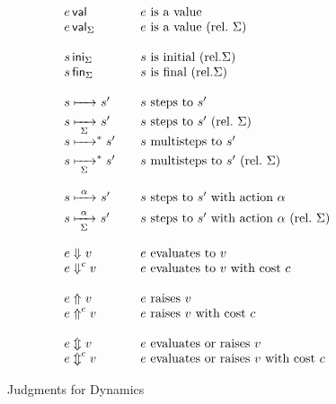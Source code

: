 \documentclass[11pt]{article}
\begin{document}
\begin{figure}[tp]
    \begin{displaymath}
        \begin{array}{l@{\qquad}l}
            \isVal{e}            &  e\ \text{is a value} \\
            \isVal[\Sigma]{e}    & e\ \text{is a value}\ (\text{rel.}\ \Sigma) \\\\
            \isIni[\Sigma]{s}            & s\ \text{is initial}\ (\text{rel.} \Sigma) \\
            \isFin[\Sigma]{s}            & s\ \text{is final}\ (\text{rel.} \Sigma) \\\\
            s\stepsTo s'         & s\ \text{steps to}\ s' \\
            s\stepsTo[\Sigma] s' & s\ \text{steps to}\ s'\ (\text{rel.}\ \Sigma)\\
            s\stepsTo(\ast) s' & s\ \text{multisteps to}\ s' \\
            s\stepsTo[\Sigma](\ast) s' & s\ \text{multisteps to}\ s'\ (\text{rel.}\ \Sigma) \\\\
            s\stepsTo<\alpha> s' & s\ \text{steps to}\ s'\ \text{with action}\ \alpha \\
            s\stepsTo[\Sigma]<\alpha> s' & s\ \text{steps to}\ s'\ \text{with action}\ \alpha\ (\text{rel.}\ \Sigma) \\\\
            e\evalsTo v          & e\ \text{evaluates to}\ v \\
            e\evalsTo(c) v       & e\ \text{evaluates to}\ v\ \text{with cost}\ c \\\\
            e\raises v           & e\ \text{raises}\ v \\
            e\raises(c) v        & e\ \text{raises}\ v\ \text{with cost}\ c \\\\
            e\evalsorraises v    & e\ \text{evaluates or raises}\ v \\
            e\evalsorraises(c) v    & e\ \text{evaluates or raises}\ v\ \text{with cost}\ c
        \end{array}
    \end{displaymath}

    \caption{Judgments for Dynamics}
    \label{fig:dynamics}
\end{figure}
\end{document}
